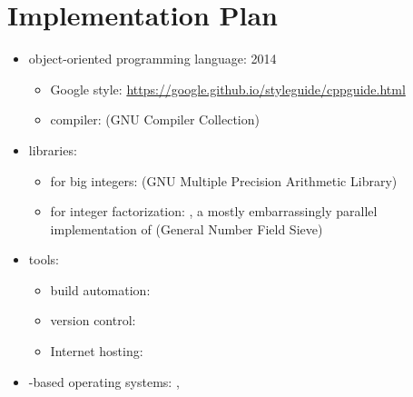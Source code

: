 \section{Implementation Plan}


\begin{itemize}
\item object-oriented programming language:  2014
  \begin{itemize}
  \item Google style:
    \url{https://google.github.io/styleguide/cppguide.html}
  \item compiler:  (GNU Compiler Collection)
  \end{itemize}
\item libraries:
  \begin{itemize}
  \item for big integers: 
    (GNU Multiple Precision Arithmetic Library)
  \item for integer factorization: ,
    a mostly embarrassingly parallel
    implementation of 
    (General Number Field Sieve)
  \end{itemize}
\item tools:
  \begin{itemize}
  \item build automation: 
  \item version control: 
  \item Internet hosting: \crygithub
  \end{itemize}
\item {}-based operating systems:
  , 
\end{itemize}
